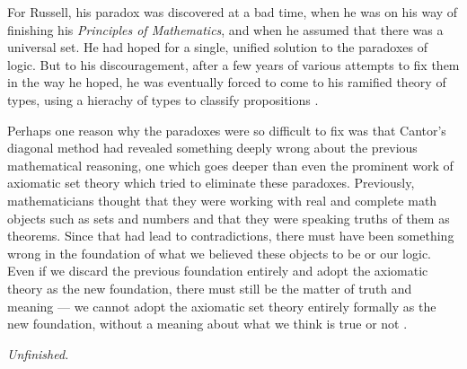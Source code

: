 \documentclass[10pt]{article}
\begin{document}
For Russell, his paradox was discovered at a bad time, when he was on his way
of finishing his \emph{Principles of Mathematics}, and when he assumed that
there was a universal set. He had hoped for a single, unified solution to the
paradoxes of logic. But to his discouragement, after a few years of various
attempts to fix them in the way he hoped, he was eventually forced to come to
his ramified theory of types, using a hierachy of types to classify
propositions \cite{companion.to.russell.tt}.

Perhaps one reason why the paradoxes were so difficult to fix was that Cantor's
diagonal method had revealed something deeply wrong about the previous
mathematical reasoning, one which goes deeper than even the prominent work of
axiomatic set theory which tried to eliminate these paradoxes. Previously,
mathematicians thought that they were working with real and complete math
objects such as sets and numbers and that they were speaking truths of them as
theorems. Since that had lead to contradictions, there must have been something
wrong in the foundation of what we believed these objects to be or our logic.
Even if we discard the previous foundation entirely and adopt the axiomatic
theory as the new foundation, there must still be the matter of truth and
meaning --- we cannot adopt the axiomatic set theory entirely formally as the
new foundation, without a meaning about what we think is true or not
\cite[Ch.~12]{kleeneitmm}.

\emph{Unfinished.}





\end{document}
